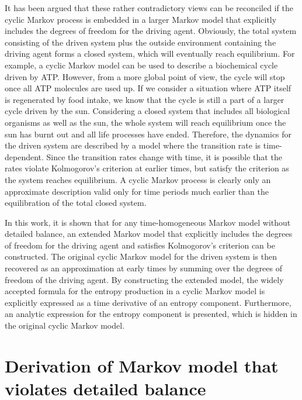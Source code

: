 \documentclass[aps,pre,amsmath,amssymb,floatfix,preprint,nofootinbib]{revtex4}
\begin{document}
 It has been argued that these rather contradictory views can be reconciled if the cyclic Markov process is embedded in a larger Markov model that explicitly includes the degrees of freedom for the driving agent\cite{zmh}. Obviously, the total system consisting of the driven system plus the outside environment containing the driving agent forms  a closed system, which will eventually reach equilibrium. For example, a cyclic Markov model can be used to describe a biochemical cycle driven by ATP. However, from a more global point of view, the cycle will stop once all ATP molecules are used up. If we consider a situation where ATP itself is regenerated by food intake, we know that the cycle is still a part of a larger cycle driven by the sun. Considering a closed system that includes all biological organisms as well as the sun, the whole system will reach equilibrium once the sun has burnt out and all life processes have ended. Therefore, the dynamics for the driven system are described by a model where the transition rate is time-dependent. Since the transition rates change with time, it is possible that the rates violate Kolmogorov's criterion at earlier times, but satisfy the criterion as the system reaches equilibrium. A cyclic Markov process is clearly only an approximate description valid only for time periods much earlier than the equilibration of the total closed system. 
 
 In this work, it is shown that for any time-homogeneous Markov model without detailed balance, an extended Markov model that explicitly includes the degrees of freedom for the driving agent and satisfies Kolmogorov's criterion can be constructed. The original cyclic Markov model for the driven system is then recovered as an approximation at early times by summing over the degrees of freedom of the driving agent. By constructing the extended model, the widely accepted formula for the entropy production in a cyclic Markov model is explicitly expressed as a time derivative of an entropy component. Furthermore, an analytic expression for the entropy component is presented, which is hidden in the original cyclic Markov model. 
 
\section{Derivation of Markov model that violates detailed balance}
\end{document}
